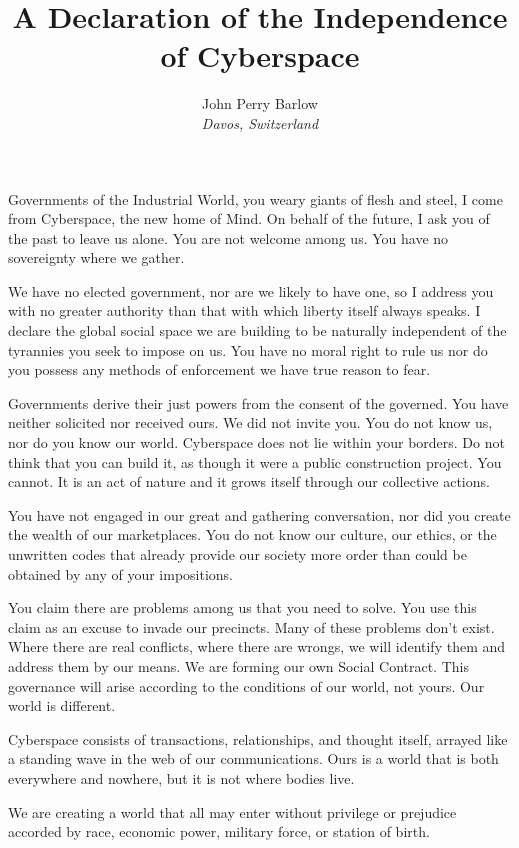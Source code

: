\documentclass[12pt]{article}
\date{\displaydate{date}}
\begin{document}
\title{A Declaration of the Independence of Cyberspace}
\author{John Perry Barlow\\\emph{Davos, Switzerland}}
\maketitle
Governments of the Industrial World, you weary giants of flesh and steel, I come from Cyberspace, the new home of Mind. On behalf of the future, I ask you of the past to leave us alone. You are not welcome among us. You have no sovereignty where we gather.

We have no elected government, nor are we likely to have one, so I address you with no greater authority than that with which liberty itself always speaks. I declare the global social space we are building to be naturally independent of the tyrannies you seek to impose on us. You have no moral right to rule us nor do you possess any methods of enforcement we have true reason to fear.

Governments derive their just powers from the consent of the governed. You have neither solicited nor received ours. We did not invite you. You do not know us, nor do you know our world. Cyberspace does not lie within your borders. Do not think that you can build it, as though it were a public construction project. You cannot. It is an act of nature and it grows itself through our collective actions.

You have not engaged in our great and gathering conversation, nor did you create the wealth of our marketplaces. You do not know our culture, our ethics, or the unwritten codes that already provide our society more order than could be obtained by any of your impositions.

You claim there are problems among us that you need to solve. You use this claim as an excuse to invade our precincts. Many of these problems don't exist. Where there are real conflicts, where there are wrongs, we will identify them and address them by our means. We are forming our own Social Contract. This governance will arise according to the conditions of our world, not yours. Our world is different.

Cyberspace consists of transactions, relationships, and thought itself, arrayed like a standing wave in the web of our communications. Ours is a world that is both everywhere and nowhere, but it is not where bodies live.

We are creating a world that all may enter without privilege or prejudice accorded by race, economic power, military force, or station of birth.
\end{document}
